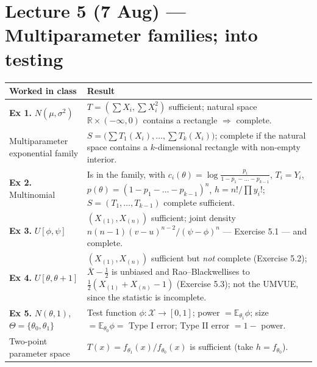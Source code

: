 \documentclass[11pt]{article}
\newcommand{\E}{\mathbb{E}}
\newcommand{\R}{\mathbb{R}}
\newcommand{\Xbar}{\overline{X}}
\begin{document}
\section*{Lecture 5 (7 Aug) --- Multiparameter families; into testing}
\begin{longtable}{@{}p{7.2cm}p{9.0cm}@{}}
\toprule
\textbf{Worked in class} & \textbf{Result} \\
\midrule
\textbf{Ex 1.} $N(\mu,\sigma^2)$ &
$T=(\sum X_i,\sum X_i^2)$ sufficient; natural space $\R\times(-\infty,0)$ contains a
rectangle $\Rightarrow$ complete. \\
Multiparameter exponential family &
$S=\big(\sum T_1(X_i),\dots,\sum T_k(X_i)\big)$; complete if the natural space contains a
$k$-dimensional rectangle with non-empty interior. \\
\textbf{Ex 2.} Multinomial &
Is in the family, with $c_i(\theta)=\log\frac{p_i}{1-p_1-\dots-p_{k-1}}$, $T_i=Y_i$,
$p(\theta)=(1-p_1-\dots-p_{k-1})^n$, $h=n!/\prod y_i!$;
$S=(T_1,\dots,T_{k-1})$ complete sufficient. \\
\textbf{Ex 3.} $U[\phi,\psi]$ &
$(X_{(1)},X_{(n)})$ sufficient; joint density
$n(n-1)(v-u)^{n-2}/(\psi-\phi)^n$ --- Exercise 5.1 --- and complete. \\
\textbf{Ex 4.} $U[\theta,\theta+1]$ &
$(X_{(1)},X_{(n)})$ sufficient but \emph{not} complete (Exercise 5.2);
$\Xbar-\tfrac12$ is unbiased and Rao--Blackwellises to $\tfrac12(X_{(1)}+X_{(n)}-1)$
(Exercise 5.3); not the UMVUE, since the statistic is incomplete. \\
\textbf{Ex 5.} $N(\theta,1)$, $\Theta=\{\theta_0,\theta_1\}$ &
Test function $\phi:\mathcal X\to[0,1]$; power $=\E_{\theta_1}\phi$; size
$=\E_{\theta_0}\phi=$ Type I error; Type II error $=1-$ power. \\
Two-point parameter space &
$T(x)=f_{\theta_1}(x)/f_{\theta_0}(x)$ is sufficient (take $h=f_{\theta_0}$). \\
\bottomrule
\end{longtable}
\end{document}
